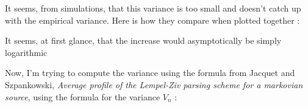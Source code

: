 	\noindent
	It seems, from simulations, that this variance is too small and doesn't
	catch up with the empirical variance. Here is how they compare when plotted
	together :
	
	
	\pagebreak
	\noindent
	It seems, at first glance, that the increase would asymptotically be 
	simply logarithmic
	
	
	\noindent 
	
	Now, I'm trying to compute the variance using the formula from	Jacquet and Szpankowski, 
	\textit{Average profile of the Lempel-Ziv parsing scheme for a markovian source},
	using the formula for the variance $V_n$ :
	
